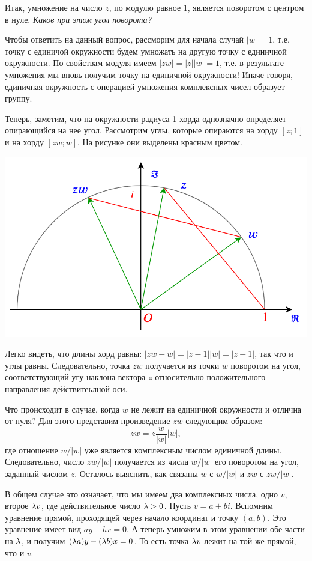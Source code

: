 \begin{enumerate}
Итак, умножение на число $z$, по модулю равное 1, является поворотом с центром в нуле. \textit{Каков при этом угол поворота?} 

Чтобы ответить на данный вопрос, рассморим для начала случай $|w|=1$, т.е. точку с единичой окружности будем умножать на другую точку с единичной окружности. По свойствам модуля имеем $|zw|=|z||w|=1$, т.е. в результате умножения мы вновь получим точку на единичной окружности! Иначе говоря, единичная окружность с операцией умножения комплексных чисел образует группу.

Теперь, заметим, что на окружности радиуса 1 хорда однозначно определяет опирающийся на нее угол. Рассмотрим углы, которые опираются на хорду $[z;1]$ и на хорду $[zw;w]$. На рисунке они выделены красным цветом.
\begin{center}
\includegraphics[scale=0.4]{complex-ring.png}
\end{center}

Легко видеть, что длины хорд равны: $|zw-w|=|z-1||w|=|z-1|$, так что и углы равны. Следовательно, точка $zw$ получается из точки $w$ поворотом на угол, соответствующий угу наклона вектора $z$ относительно положительного направления действитеьлной оси.

Что происходит в случае, когда $w$ не лежит на единичной окружности и отлична от нуля? Для этого представим произведение $zw$ следующим образом:
$$
zw = z\frac{w}{|w|}|w|,
$$
где отношение $w/|w|$ уже является комплексным числом единичной длины. Следовательно, число $zw/|w|$ получается из числа $w/|w|$ его поворотом на угол, заданный числом $z$. Осталось выяснить, как связаны $w$ с $w/|w|$ и $zw$ с $zw/|w|$.

В общем случае это означает, что мы имеем два комплексных числа, одно $v$, второе $\lambda v$, где действительное число $\lambda>0$. Пусть $v=a+bi$. Вспомним уравнение прямой, проходящей через начало координат и точку $(a,b)$. Это уравнение имеет вид $ay-bx=0$. А теперь умножим в этом уравнении обе части на $\lambda$, и получим $(\lambda a)y-(\lambda b)x=0$. То есть точка $\lambda v$ лежит на той же прямой, что и $v$.


\end{enumerate}
